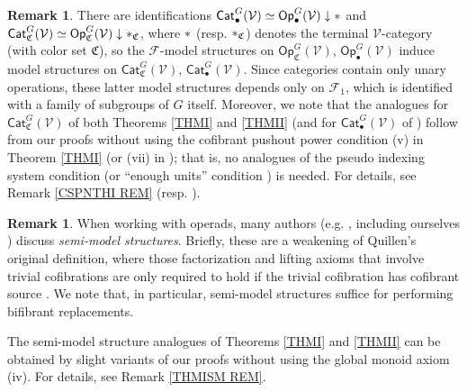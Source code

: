 \documentclass[a4paper,10pt
,draft
]{article}%
\numberwithin{equation}{section}
\numberwithin{figure}{section}
\theoremstyle{definition} %
\newtheorem{remark}[equation]{Remark}%
\newcommand{\Cat}{\mathsf{Cat}}
\newcommand{\Op}{\mathsf{Op}}%
\newcommand{\F}{\ensuremath{\mathcal F}}
\newcommand{\V}{\ensuremath{\mathcal V}}
\newcommand{\1}{\ensuremath{\mathbbm 1}}%
\begin{document}
\begin{remark}\label{RESTTOCATS REM}
	There are identifications
	$\Cat_\bullet^G(\V) \simeq \Op_\bullet^G(\V) \downarrow \**$ and
	$\Cat_{\mathfrak C}^G(\V) \simeq \Op_{\mathfrak C}^G(\V) \downarrow \**_{\mathfrak C}$,
        where $\**$ (resp. $\**_{\mathfrak C}$) denotes the terminal $\V$-category (with color set $\mathfrak C$),
	so the $\F$-model structures on $\Op_{\mathfrak C}^G(\V)$, $\Op_\bullet^G(\V)$
	induce model structures on $\Cat_{\mathfrak C}^G(\V)$, $\Cat_\bullet^G(\V)$.
	Since categories contain only unary operations,
	these latter model structures depends only on $\F_1$,
	which is identified with a family of subgroups of $G$ itself.
        Moreover, we note that the analogues for $\Cat_{\mathfrak C}^G(\V)$
	of both Theorems \ref{THMI} and \ref{THMII}
        (and for $\Cat_\bullet^G(\V)$ of \cite[Thm. \ref{AC-THMA}]{BP_ACOP})
	follow from our proofs without using
	the cofibrant pushout power condition (v)
	in Theorem \ref{THMI}
        (or (vii) in \cite[Thm. \ref{AC-THMA}]{BP_ACOP});
        that is, no analogues of the pseudo indexing system condition (or ``enough units'' condition ) is needed.
	For details, see Remark \ref{CSPNTHI REM} (resp. \cite[Remark \ref{AC-ALBEETA_REM}]{BP_ACOP}).
\end{remark}



\begin{remark}\label{SEMI_REM}
	When working with operads, many authors (e.g. \cite{Spi,Whi17,WY18}, including ourselves \cite{BP_geo})
	discuss \emph{semi-model structures}.
	Briefly, these are a weakening of Quillen's original definition,
	where those factorization and lifting axioms
	that involve trivial cofibrations
	are only required to hold if the trivial cofibration 
	has cofibrant source \cite[\S 2.2]{WY18}.
	We note that, in particular, semi-model structures suffice for 
	performing %
	bifibrant replacements.
        
	The semi-model structure analogues of 
	Theorems \ref{THMI} and \ref{THMII}
	can be obtained by slight variants of our proofs
	without using the global monoid axiom (iv).
	For details, see Remark \ref{THMISM REM}.
\end{remark}



\end{document}
